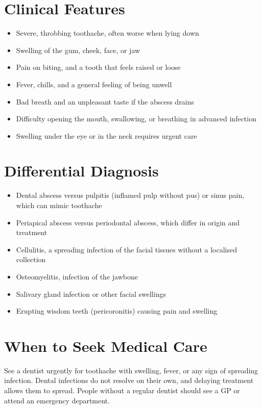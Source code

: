 \section*{Clinical Features}
\begin{itemize}
    \item Severe, throbbing toothache, often worse when lying down
    \item Swelling of the gum, cheek, face, or jaw
    \item Pain on biting, and a tooth that feels raised or loose
    \item Fever, chills, and a general feeling of being unwell
    \item Bad breath and an unpleasant taste if the abscess drains
    \item Difficulty opening the mouth, swallowing, or breathing in advanced infection
    \item Swelling under the eye or in the neck requires urgent care
\end{itemize}

\section*{Differential Diagnosis}
\begin{itemize}
    \item Dental abscess versus pulpitis (inflamed pulp without pus) or sinus pain, which can mimic toothache
    \item Periapical abscess versus periodontal abscess, which differ in origin and treatment
    \item Cellulitis, a spreading infection of the facial tissues without a localised collection
    \item Osteomyelitis, infection of the jawbone
    \item Salivary gland infection or other facial swellings
    \item Erupting wisdom teeth (pericoronitis) causing pain and swelling
\end{itemize}

\section*{When to Seek Medical Care}
See a dentist urgently for toothache with swelling, fever, or any sign of spreading infection. Dental infections do not resolve on their own, and delaying treatment allows them to spread. People without a regular dentist should see a GP or attend an emergency department.


